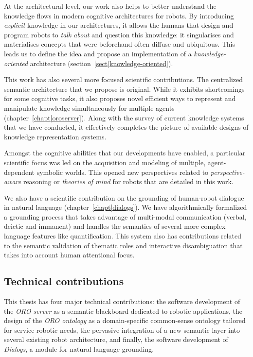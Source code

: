 At the architectural level, our work also helps to better understand the
knowledge flows in modern cognitive architectures for robots. By introducing
\emph{explicit} knowledge in our architectures, it allows the humans that
design and program robots to \emph{talk about} and question this knowledge: it
singularises and materialises concepts that were beforehand often diffuse and
ubiquitous. This leads us to define the idea and propose an implementation of a
\emph{knowledge-oriented} architecture (section~\ref{sect|knowledge-oriented}).

This work has also several more focused scientific contributions. The
centralized semantic architecture that we propose is original. While it
exhibits shortcomings for some cognitive tasks, it also proposes novel
efficient ways to represent and manipulate knowledge simultaneously for
multiple agents (chapter~\ref{chapt|oroserver}). Along with the survey of
current knowledge systems that we have conducted, it effectively completes the
picture of available designs of knowledge representation systems.

Amongst the cognitive abilities that our developments have enabled, a
particular scientific focus was led on the acquisition and modeling of
multiple, agent-dependent symbolic worlds. This opened new perspectives related
to \emph{perspective-aware} reasoning or \emph{theories of mind} for robots
that are detailed in this work.

We also have a scientific contribution on the grounding of human-robot dialogue
in natural language (chapter~\ref{chapt|dialogs}). We have algorithmically
formalized a grounding process that takes advantage of multi-modal
communication (verbal, deictic and immanent) and handles the semantics of
several more complex language features like quantification. This system also
has contributions related to the semantic validation of thematic roles and
interactive disambiguation that takes into account human attentional focus.

\subsection{Technical contributions}
\label{sect|technical-contributions}


This thesis has four major technical contributions: the software development of
the \emph{ORO server} as a semantic blackboard dedicated to robotic
applications, the design of the \emph{ORO ontology} as a domain-specific
common-sense ontology tailored for service robotic needs, the pervasive
integration of a new semantic layer into several existing robot architecture,
and finally, the software development of \emph{Dialogs}, a module for natural
language grounding.

